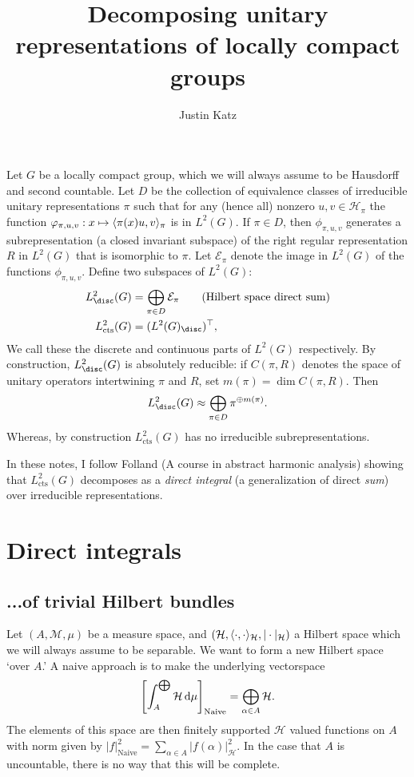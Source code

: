 \documentclass[11pt]{amsart}
\title{Decomposing unitary representations of locally compact groups}
\author{Justin Katz}
\newcommand{\M}{\mathcal{M}}
\newcommand{\E}{\mathcal{E}}
\renewcommand{\H}{\mathcal{H}}
\newcommand{\cts}{\operatorname{cts}}
\newcommand{\nai}{\operatorname{Naive}}
\begin{document}
\maketitle
Let $G$ be a locally compact group, which we will always assume to be Hausdorff and second countable. Let $D$ be the collection of equivalence classes of irreducible unitary representations $\pi$ such that for any (hence all) nonzero $u,v\in \H_{\pi}$ the function $\varphi_{\pi,u,v}:x \mapsto \langle \pi(x)u, v \rangle_{\pi}$ is in $L^{2}(G)$. If $\pi \in D$, then $\phi_{\pi,u,v}$ generates a subrepresentation (a closed invariant subspace) of the right regular representation $R$ in $L^{2}(G)$ that is isomorphic to $\pi$. Let $\E_{\pi}$ denote the image in $L^{2}(G)$ of the functions $\phi_{\pi,u,v}$. Define two subspaces of $L^{2}(G)$: 
	\begin{align*}
		L^{2}_{\disc}(G)&=\bigoplus_{\pi \in D}\E_{\pi} \qquad \text{(Hilbert space direct sum)}\\
		L^{2}_{\cts}(G)&=(L^{2}(G)_{\disc})^{\top}, 
	\end{align*}
We call these the discrete and continuous parts of $L^{2}(G)$ respectively. By construction, $L^{2}_{\disc}(G)$ is absolutely reducible: if $C(\pi,R)$ denotes the space of unitary operators intertwining $\pi$ and $R$, set $m(\pi)=\dim C(\pi,R)$. Then 
	\begin{align*}
		L^{2}_{\disc}(G)\approx \bigoplus_{\pi \in D} \pi^{\oplus m(\pi)}.
	\end{align*}
Whereas, by construction $L^{2}_{\cts}(G)$ has no irreducible subrepresentations.

\par In these notes, I follow Folland (A course in abstract harmonic analysis) showing that $L^{2}_{\cts}(G)$ decomposes as a \emph{direct integral} (a generalization of direct \emph{sum}) over irreducible representations. 


\section{Direct integrals}
\subsection{...of trivial Hilbert bundles} Let $(A,\M,\mu)$ be a measure space, and $(\H,\ip{\cdot}{\cdot}_{\H},|\cdot|_{\H})$ a Hilbert space which we will always assume to be separable. We want to form a new Hilbert space `over $A$.'  A naive approach is to make the underlying vectorspace 
	\begin{align*}
		\left[\int_{A}^{\bigoplus}\H \dop \mu\right]_{\nai}=\bigoplus_{\alpha \in A} \H.
	\end{align*}
The elements of this space are then finitely supported $\H$ valued functions on $A$ with norm given by $|f|^{2}_{\nai}=\sum_{\alpha \in A} |f(\alpha)|_{\H}^{2}$. In the case that $A$ is uncountable, there is no way that this will be complete.
\end{document}
